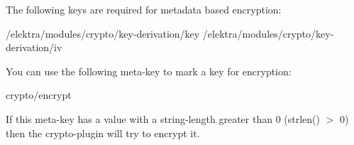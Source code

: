 The following keys are required for metadata based encryption\+: \begin{DoxyVerb}    /elektra/modules/crypto/key-derivation/key
    /elektra/modules/crypto/key-derivation/iv
\end{DoxyVerb}


You can use the following meta-\/key to mark a key for encryption\+: \begin{DoxyVerb}    crypto/encrypt
\end{DoxyVerb}


If this meta-\/key has a value with a string-\/length greater than 0 ({\ttfamily strlen() $>$ 0}) then the crypto-\/plugin will try to encrypt it. 